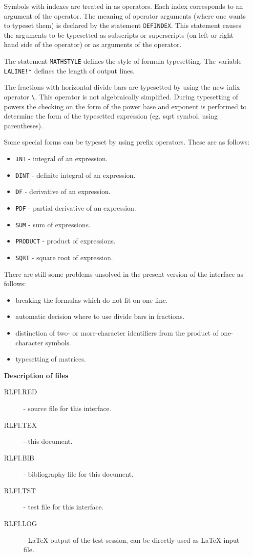 Symbols with indexes are treated in \REDUCE{} as operators.  Each index
corresponds to an argument of the operator.  The meaning of operator
arguments (where one wants to typeset them) is declared by the statement
{\tt DEFINDEX}.  This statement causes the arguments to be typesetted as
subscripts or superscripts (on left or right-hand side of the operator)
or as arguments of the operator.

The statement {\tt MATHSTYLE} defines the style of formula typesetting.
The variable {\tt LALINE!*} defines the length of output lines.

The fractions with horizontal divide bars are typesetted by using the
new \REDUCE{} infix operator \verb+\+.  This operator is not
algebraically simplified.  During typesetting of powers the checking on
the form of the power base and exponent is performed to determine the
form of the typesetted expression (eg.  sqrt symbol, using parentheses).

Some special forms can be typeset by using \REDUCE{} prefix operators.
These are as follows:
\begin{itemize}
\item {\tt INT} - integral of an expression.
\item {\tt DINT} - definite integral of an expression.
\item {\tt DF} - derivative of an expression.
\item {\tt PDF} - partial derivative of an expression.
\item {\tt SUM} - sum of expressions.
\item {\tt PRODUCT} - product of expressions.
\item {\tt SQRT} - square root of expression.
\end{itemize}
There are still some problems unsolved in the present version of the
interface as follows:
\begin{itemize}
\item breaking the formulas which do not fit on one line.
\item automatic decision where to use divide bars in fractions.
\item distinction of two- or more-character identifiers from the product
  of one-character symbols.
\item typesetting of matrices.
\end{itemize}

\vskip0.5cm

\centerline{\bf Description of files}

\begin{description}
\item[RLFI.RED] - \REDUCE{} source file for this interface.
\item[RLFI.TEX] - this document.
\item[RLFI.BIB] - bibliography file for this document.
\item[RLFI.TST] - test file for this interface.
\item[RLFI.LOG] - \LaTeX{} output of the test session,
                   can be directly used as \LaTeX{} input file.
\end{description}


